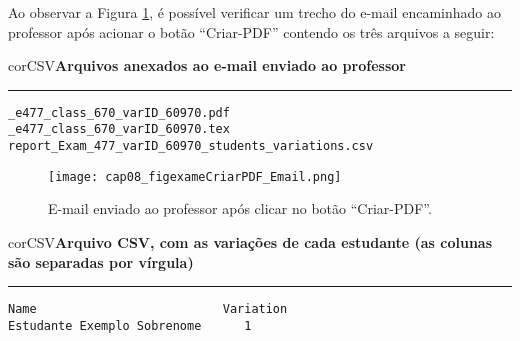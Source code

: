Ao observar a Figura \ref{fig:cap08_figexameCriarPDF_Email}, é possível verificar um trecho do e-mail encaminhado ao professor após acionar o botão ``Criar-PDF'' contendo os três arquivos a seguir:

\begin{myboxCode}{corCSV}{\textbf{Arquivos anexados ao e-mail enviado ao professor}}\vspace{3mm}
\hrule
\begin{verbatim}
_e477_class_670_varID_60970.pdf
_e477_class_670_varID_60970.tex
report_Exam_477_varID_60970_students_variations.csv
\end{verbatim}
\end{myboxCode}
 
\begin{figure}[!ht]
  \centering
  \texttt{[image: cap08\_figexameCriarPDF\_Email.png]}
   \caption{E-mail enviado ao professor após clicar no botão ``Criar-PDF''.}
\label{fig:cap08_figexameCriarPDF_Email}
\end{figure}


\begin{myboxCode}{corCSV}{\textbf{Arquivo CSV, com as variações de cada estudante (as colunas são separadas por vírgula)}}\vspace{3mm}
\hrule
\begin{verbatim}
Name                          Variation
Estudante Exemplo Sobrenome      1
\end{verbatim}
\end{myboxCode}



